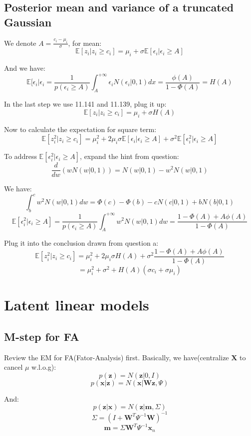 \documentclass[UTF8]{ctexart}
\begin{document}
\subsection{Posterior mean and variance of a truncated Gaussian}
We denote $A=\frac{c_{i}-\mu_{i}}{\sigma}$, for mean:
$$\mathbb{E}[z_{i}|z_{i} \geq c_{i}]=\mu_{i}+\sigma \mathbb{E}[\epsilon_{i}|\epsilon_{i} \geq A]$$

And we have:
$$\mathbb{E}[\epsilon_{i}|\epsilon_{i}=\frac{1}{p(\epsilon_{i} \geq A)}\int_{A}^{+\infty}\epsilon_{i}N(\epsilon_{i}|0,1)dx=\frac{\phi(A)}{1-\Phi(A)}=H(A)$$

In the last step we use 11.141 and 11.139, plug it up:
$$\mathbb{E}[z_{i}|z_{i} \geq c_{i}]=\mu_{i}+\sigma H(A)$$

Now to calculate the expectation for square term:
$$\mathbb{E}[z_{i}^{2}|z_{i} \geq c_{i}]=\mu_{i}^{2} + 2\mu_{i}\sigma \mathbb{E}[\epsilon_{i}|\epsilon_{i} \geq A] + \sigma^{2}\mathbb{E}[\epsilon_{i}^{2}|\epsilon_{i} \geq A]$$

To address $\mathbb{E}[\epsilon_{i}^{2}|\epsilon_{i} \geq A]$, expand the hint from question:
$$\frac{d}{dw}(wN(w|0,1))=N(w|0,1)-w^{2}N(w|0,1)$$

We have:
$$\int_{b}^{c}w^{2}N(w|0,1)dw=\Phi(c)-\Phi(b)-cN(c|0,1)+bN(b|0,1)$$
$$\mathbb{E}[\epsilon_{i}^{2}|\epsilon_{i} \geq A]=\frac{1}{p(\epsilon_{i}\geq A)}\int_{A}^{+\infty}w^{2}N(w|0,1)dw=\frac{1-\Phi(A)+A\phi(A)}{1-\Phi(A)}$$

Plug it into the conclusion drawn from question a:
$$\mathbb{E}[z_{i}^{2}|z_{i} \geq c_{i}]=\mu_{i}^{2}+2\mu_{i}\sigma H(A) + \sigma^{2}\frac{1-\Phi(A)+A\phi(A)}{1-\Phi(A)}$$
$$=\mu_{i}^{2} + \sigma^{2} + H(A)(\sigma c_{i} + \sigma \mu_{i})$$

\newpage
\section{Latent linear models}
\subsection{M-step for FA}
Review the EM for FA(Fator-Analysis) first. Basically, we have(centralize $\textbf{X}$ to cancel $\mu$ w.l.o.g):
$$p(\textbf{z})=N(\textbf{z}|0,I)$$
$$p(\textbf{x}|\textbf{z})=N(\textbf{x}|\textbf{W}\textbf{z},\Psi)$$

And:
$$p(\textbf{z}|\textbf{x})=N(\textbf{z}|\textbf{m},\Sigma)$$
$$\Sigma=(I+\textbf{W}^{T}\Psi^{-1}\textbf{W})^{-1}$$
$$\textbf{m}=\Sigma\textbf{W}^{T}\Psi^{-1}\textbf{x}_{n}$$
\end{document}
